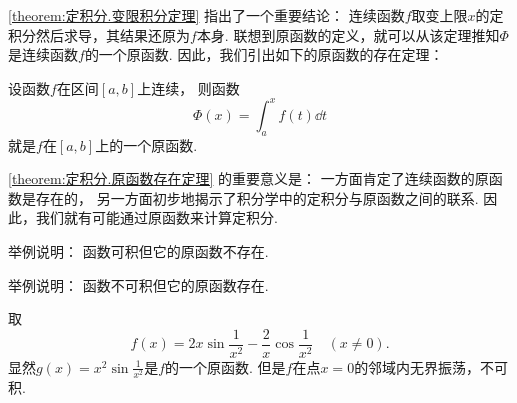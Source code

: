 \cref{theorem:定积分.变限积分定理} 指出了一个重要结论：
连续函数\(f\)取变上限\(x\)的定积分然后求导，其结果还原为\(f\)本身.
联想到原函数的定义，就可以从该定理推知\(\Phi\)是连续函数\(f\)的一个原函数.
因此，我们引出如下的原函数的存在定理：
\begin{theorem}[原函数存在定理]\label{theorem:定积分.原函数存在定理}
设函数\(f\)在区间\([a,b]\)上连续，
则函数\[
	\Phi(x) = \int_a^x f(t) \dd{t}
\]就是\(f\)在\([a,b]\)上的一个原函数.
\end{theorem}
\cref{theorem:定积分.原函数存在定理} 的重要意义是：
一方面肯定了连续函数的原函数是存在的，
另一方面初步地揭示了积分学中的定积分与原函数之间的联系.
因此，我们就有可能通过原函数来计算定积分.

\begin{example}
举例说明：
函数可积但它的原函数不存在.
\end{example}

\begin{example}
举例说明：
函数不可积但它的原函数存在.
\begin{solution}
取\[
	f(x) = 2 x \sin\frac1{x^2} - \frac2x \cos\frac1{x^2}
	\quad(x\neq0).
\]
显然\(g(x) = x^2 \sin\frac1{x^2}\)是\(f\)的一个原函数.
但是\(f\)在点\(x=0\)的邻域内无界振荡，不可积.
\end{solution}
\end{example}

